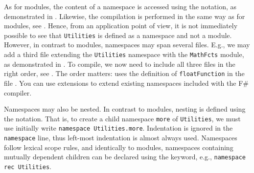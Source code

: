 \documentclass[fsharpNotes.tex]{subfiles}
\begin{document}
As for modules, the content of a namespace is accessed using the  notation, as demonstrated in .
%
%
Likewise, the compilation is performed in the same way as for modules, see .
%
%
Hence, from an application point of view, it is not immediately possible to see that \lstinline{Utilities} is defined as a namespace and not a module.  However, in contrast to modules, namespaces may span several files. E.g., we may add a third file extending the \lstinline{Utilities} namespace with the \lstinline{MathFcts} module, as demonstrated in .
%
%
To compile, we now need to include all three files in the right order, see .
%
%
The order matters: uses the definition of \lstinline{floatFunction} in the file . You can use extensions to extend existing namespaces included with the F\# compiler.

Namespaces may also be nested. In contrast to modules, nesting is defined using the  notation. That is, to create a child namespace \lstinline{more} of \lstinline{Utilities}, we must use initially write \mbox{\lstinline{namespace Utilities.more}}. Indentation is ignored in the \lstinline{namespace} line, thus left-most indentation is almost always used. Namespaces follow lexical scope rules, and identically to modules, namespaces containing mutually dependent children can be declared using the  keyword, e.g., \mbox{\lstinline{namespace rec Utilities}}.
\end{document}
